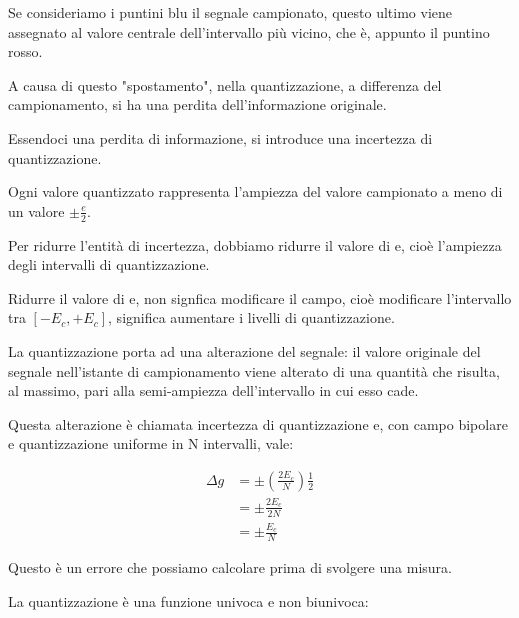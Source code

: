 Se consideriamo i puntini blu il segnale campionato, 
questo ultimo viene assegnato al valore centrale dell'intervallo 
più vicino, che è, appunto il puntino rosso. \newline 

A causa di questo "spostamento", nella quantizzazione, a differenza del campionamento, 
si ha una perdita dell'informazione originale. \newline 

Essendoci una perdita di informazione, si introduce una incertezza di quantizzazione. \newline 

Ogni valore quantizzato rappresenta l'ampiezza del valore campionato a meno di un valore $\pm \frac{e}{2}$. \newline 

Per ridurre l'entità di incertezza, dobbiamo ridurre il valore di e, cioè l'ampiezza degli intervalli di quantizzazione. \newline 

Ridurre il valore di e, non signfica modificare il campo, cioè modificare l'intervallo tra $[-E_c, + E_c]$, 
significa aumentare i livelli di quantizzazione. \newline 

La quantizzazione porta ad una alterazione del segnale: il valore originale del segnale nell'istante di campionamento 
viene alterato di una quantità che risulta, al massimo, pari alla semi-ampiezza dell'intervallo in cui esso cade. \newline 

Questa alterazione è chiamata incertezza di quantizzazione e, 
con campo bipolare e quantizzazione uniforme in N intervalli, vale: 

{
    \Large 
    \begin{equation}
        \begin{split}
            \Delta g 
            &= 
            \pm \left( \frac{2 E_c}{N}\right) \frac{1}{2}
            \\ 
            &= \pm \frac{2 E_c}{2N}
            \\
            &= \pm \frac{E_c}{N}
        \end{split}
    \end{equation}
}

Questo è un errore che possiamo calcolare prima di svolgere una misura. \newline 

La quantizzazione è una funzione univoca e non biunivoca: 

